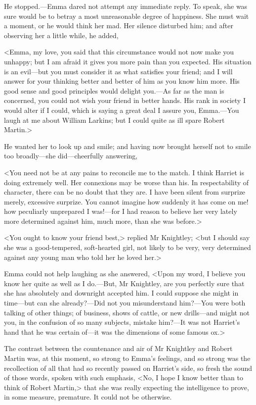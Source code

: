He stopped.—Emma dared not attempt any immediate reply. To speak, she was sure would be to betray a most unreasonable degree of happiness. She must wait a moment, or he would think her mad. Her silence disturbed him; and after observing her a little while, he added,

<Emma, my love, you said that this circumstance would not now make you unhappy; but I am afraid it gives you more pain than you expected. His situation is an evil—but you must consider it as what satisfies your friend; and I will answer for your thinking better and better of him as you know him more. His good sense and good principles would delight you.—As far as the man is concerned, you could not wish your friend in better hands. His rank in society I would alter if I could, which is saying a great deal I assure you, Emma.—You laugh at me about William Larkins; but I could quite as ill spare Robert Martin.>

He wanted her to look up and smile; and having now brought herself not to smile too broadly—she did—cheerfully answering,

<You need not be at any pains to reconcile me to the match. I think Harriet is doing extremely well. Her connexions may be worse than his. In respectability of character, there can be no doubt that they are. I have been silent from surprize merely, excessive surprize. You cannot imagine how suddenly it has come on me! how peculiarly unprepared I was!—for I had reason to believe her very lately more determined against him, much more, than she was before.>

<You ought to know your friend best,> replied Mr Knightley; <but I should say she was a good-tempered, soft-hearted girl, not likely to be very, very determined against any young man who told her he loved her.>

Emma could not help laughing as she answered, <Upon my word, I believe you know her quite as well as I do.—But, Mr Knightley, are you perfectly sure that she has absolutely and downright accepted him. I could suppose she might in time—but can she already?—Did not you misunderstand him?—You were both talking of other things; of business, shows of cattle, or new drills—and might not you, in the confusion of so many subjects, mistake him?—It was not Harriet's hand that he was certain of—it was the dimensions of some famous ox.>

The contrast between the countenance and air of Mr Knightley and Robert Martin was, at this moment, so strong to Emma's feelings, and so strong was the recollection of all that had so recently passed on Harriet's side, so fresh the sound of those words, spoken with such emphasis, <No, I hope I know better than to think of Robert Martin,> that she was really expecting the intelligence to prove, in some measure, premature. It could not be otherwise.

